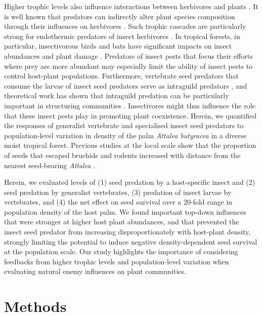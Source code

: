 \documentclass[b5paper,justified]{tufte-book} %
\begin{document}
\begin{fullwidth}
Higher trophic levels also influence interactions between herbivores and plants \citep{Terborgh2010}. It is well known that predators can indirectly alter plant species composition through their influences on herbivores \citep{Schmitz2006}. Such trophic cascades are particularly strong for endothermic predators of insect herbivores
\citep{Borer2005}. In tropical forests, in particular, insectivorous birds and bats have significant impacts on insect abundances and plant damage \citep{VanBael2005, Kalka2008}. Predators of insect pests that focus their efforts where prey are more abundant \citep[e.g.][]{Oksanen1981} may especially limit the ability of insect
pests to control host-plant populations. Furthermore, vertebrate seed predators that consume the larvae of insect seed predators serve as intraguild predators \citep{Silvius2002}, and theoretical work has shown that intraguild predation can be particularly important in structuring communities \citep{Holt1997}. Insectivores might thus influence the role that these insect pests play in promoting plant coexistence. Herein, we quantified the responses of generalist vertebrate and specialised insect seed predators to population-level variation in density of the palm \textit{Attalea butyracea} in a diverse moist tropical forest. Previous studies at the local scale show that the proportion of seeds that escaped bruchids and rodents increased with distance from the nearest seed-bearing \textit{Attalea} \citep{Wright1983, Wright2001a}.

Herein, we evaluated levels of (1) seed predation by a host-specific insect and (2) seed predation by generalist vertebrates, (3) predation of insect larvae by vertebrates, and (4) the net effect on seed survival over a 20-fold range in population density of the host palm. We found important top-down influences that were stronger at higher
host plant abundances, and that prevented the insect seed predator from increasing disproportionately with host-plant density, strongly limiting the potential to induce negative density-dependent seed survival at the population scale. Our study highlights the importance of considering feedbacks from higher trophic levels and population-level variation when evaluating natural enemy influences on plant communities.

\section{Methods} 


\end{fullwidth}
\end{document}
